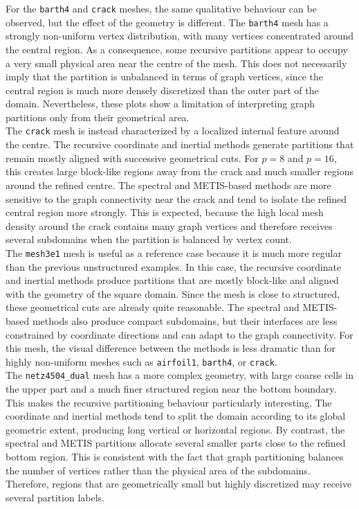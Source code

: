 \documentclass[unicode,10pt,a4paper,oneside,numbers=endperiod,openany]{scrartcl}
\begin{document}
For the \texttt{barth4} and \texttt{crack} meshes, the same qualitative behaviour can be observed,
but the effect of the geometry is different. The \texttt{barth4} mesh has a strongly non-uniform
vertex distribution, with many vertices concentrated around the central region. As a consequence,
some recursive partitions appear to occupy a very small physical area near the centre of the mesh.
This does not necessarily imply that the partition is unbalanced in terms of graph vertices, since
the central region is much more densely discretized than the outer part of the domain. Nevertheless,
these plots show a limitation of interpreting graph partitions only from their geometrical area.\\

The \texttt{crack} mesh is instead characterized by a localized internal feature around the centre.
The recursive coordinate and inertial methods generate partitions that remain mostly aligned with
successive geometrical cuts. For \(p=8\) and \(p=16\), this creates large block-like regions away
from the crack and much smaller regions around the refined centre. The spectral and METIS-based
methods are more sensitive to the graph connectivity near the crack and tend to isolate the refined
central region more strongly. This is expected, because the high local mesh density around the crack
contains many graph vertices and therefore receives several subdomains when the partition is balanced
by vertex count.\\

The \texttt{mesh3e1} mesh is useful as a reference case because it is much more regular than the
previous unstructured examples. In this case, the recursive coordinate and inertial methods produce
partitions that are mostly block-like and aligned with the geometry of the square domain. Since the
mesh is close to structured, these geometrical cuts are already quite reasonable. The spectral and
METIS-based methods also produce compact subdomains, but their interfaces are less constrained by
coordinate directions and can adapt to the graph connectivity. For this mesh, the visual difference
between the methods is less dramatic than for highly non-uniform meshes such as \texttt{airfoil1},
\texttt{barth4}, or \texttt{crack}.\\

The \texttt{netz4504\_dual} mesh has a more complex geometry, with large coarse cells in the upper
part and a much finer structured region near the bottom boundary. This makes the recursive
partitioning behaviour particularly interesting. The coordinate and inertial methods tend to split
the domain according to its global geometric extent, producing long vertical or horizontal regions.
By contrast, the spectral and METIS partitions allocate several smaller parts close to the refined
bottom region. This is consistent with the fact that graph partitioning balances the number of
vertices rather than the physical area of the subdomains. Therefore, regions that are geometrically
small but highly discretized may receive several partition labels.\\
\end{document}
